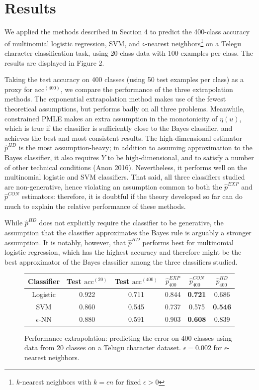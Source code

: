 \documentclass{article}
\begin{document}
\section{Results}

We applied the methods described in Section 4 to predict the 400-class accuracy of multinomial
logistic regression, SVM, and $\epsilon$-nearest neighbors\footnote{$k$-nearest neighbors with $k = \epsilon n$ for fixed $\epsilon > 0$} on a Telegu character classification task,
using 20-class data with 100 examples per class.  The results are displayed in Figure 2.

Taking the test accuracy on 400 classes (using 50 test examples per class) as a proxy for $\text{acc}^{(400)}$,
we compare the performance of the three extrapolation methods.
The exponential extrapolation method makes use of the fewest theoretical assumptions,
but performs badly on all three problems.  Meanwhile, constrained PMLE makes an extra assumption
in the monotonicity of $\eta(u)$, which is true if the classifier is sufficiently close to the Bayes classifier,
and achieves the best and most consistent results.  The high-dimensional estimator $\hat{p}^{HD}$ is
the most assumption-heavy; in addition to assuming approximation to the Bayes classifier,
it also requires $Y$ to be high-dimensional, and to satisfy a number of other technical conditions (Anon 2016).
Nevertheless, it performs well on the multinomial logistic and SVM classifiers.
That said, all three classifiers studied are non-generative, hence violating an assumption common to both the $\hat{p}^{EXP}$
and $\hat{p}^{CON}$ estimators: therefore, it is doubtful if the theory developed so far can do much to explain
the relative performance of these methods.  

While $\hat{p}^{HD}$ does not explicitly require the classifier to be generative,
the assumption that the classifier approximates the Bayes rule is arguably a stronger assumption.
It is notably, however, that $\hat{p}^{HD}$ performs best for multinomial logistic regression,
which has the highest accuracy and therefore might be the best approximator of the Bayes classifier among the three classifiers studied.

\begin{figure}
\centering
\begin{tabular}{|c||c|c|c|c|c|}\hline
Classifier & Test $\text{acc}^{(20)}$ & Test $\text{acc}^{(400)}$ & $\hat{p}^{EXP}_{400}$ & $\hat{p}^{CON}_{400}$ & $\hat{p}^{HD}_{400}$\\ \hline
Logistic & 0.922 & 0.711 & 0.844 & \textbf{0.721} & 0.686 \\ \hline
SVM & 0.860 & 0.545 & 0.737 & 0.575 & \textbf{0.546} \\ \hline
$\epsilon$-NN & 0.880 & 0.591 & 0.903 & \textbf{0.608} & 0.839\\ \hline
\end{tabular}
\caption{Performance extrapolation: predicting the error on 400 classes using data from 20 classes on a Telugu character dataset.
$\epsilon = 0.002$ for $\epsilon$-nearest neighbors.}
\end{figure}
\end{document}
